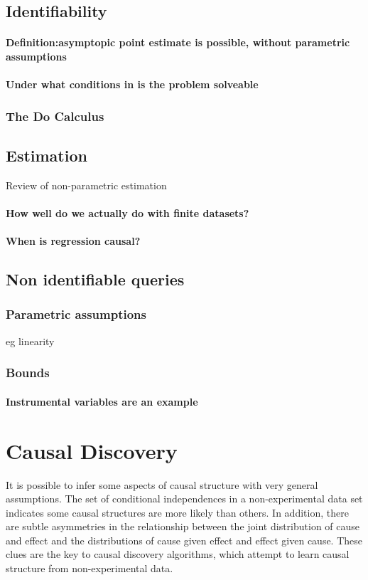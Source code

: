 \documentclass[11pt,a4paper,oneside]{book}
\begin{document}
\subsection*{Identifiability}
\paragraph*{Definition:asymptopic point estimate is possible, without parametric assumptions}
\paragraph*{Under what conditions in is the problem solveable}
\subsubsection*{The Do Calculus}


\subsection*{Estimation}
\cite{Imbens2004} Review of non-parametric estimation
\paragraph*{How well do we actually do with finite datasets?}

\paragraph*{When is regression causal?}


\subsection*{Non identifiable queries}

\subsubsection*{Parametric assumptions}
eg linearity

\subsubsection*{Bounds}
\paragraph{Instrumental variables are an example}


\section*{Causal Discovery}
It is possible to infer some aspects of causal structure with very general assumptions. The set of conditional independences in a non-experimental data set indicates some causal structures are more likely than others. In addition, there are subtle asymmetries in the relationship between the joint distribution of cause and effect and the distributions of cause given effect and effect given cause. These clues are the key to causal discovery algorithms, which attempt to learn causal structure from non-experimental data. 
\end{document}
